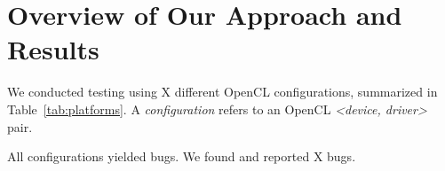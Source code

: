 \section{Overview of Our Approach and Results}\label{sec:overview}

We conducted testing using X different OpenCL configurations, summarized in Table~\ref{tab:platforms}. A \emph{configuration} refers to an OpenCL \emph{<device, driver>} pair.



All configurations yielded bugs. We found and reported X bugs.